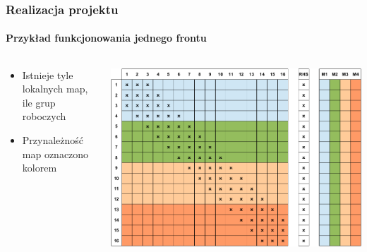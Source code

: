 \documentclass[12pt,handout]{beamer}
\begin{document}
\begin{frame}
\frametitle{Realizacja projektu}
\framesubtitle{Przykład funkcjonowania jednego frontu}
\begin{columns}[t] %
     \begin{column}[T]{5cm} %
     \begin{itemize}
		\item Istnieje tyle lokalnych map, ile grup roboczych
		\item Przynależność map oznaczono kolorem
     \end{itemize}
     \end{column}
     \begin{column}[T]{7cm} %
		\includegraphics[scale=0.3]{frame0.jpg}
     \end{column}
     \end{columns}
\end{frame}
\end{document}
